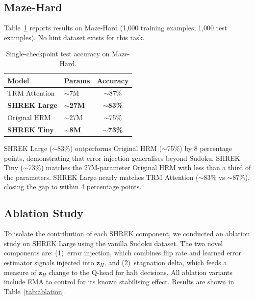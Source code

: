 \subsection{Maze-Hard}

Table~\ref{tab:maze} reports results on Maze-Hard (1{,}000 training examples, 1{,}000 test examples). No hint dataset exists for this task.

\begin{table}[htbp]
    \centering
    \caption{Single-checkpoint test accuracy on Maze-Hard.}
    \label{tab:maze}
    \begin{tabular}{llc}
        \toprule
        \textbf{Model}       & \textbf{Params}    & \textbf{Accuracy}   \\
        \midrule
        TRM Attention        & $\sim$7M           & $\sim$87\%          \\
        \textbf{SHREK Large} & \textbf{$\sim$27M} & \textbf{$\sim$83\%} \\
        Original HRM         & $\sim$27M          & $\sim$75\%          \\
        \textbf{SHREK Tiny}  & \textbf{$\sim$8M}  & \textbf{$\sim$73\%} \\
        \bottomrule
    \end{tabular}
\end{table}

SHREK Large ($\sim$83\%) outperforms Original HRM ($\sim$75\%) by 8 percentage points, demonstrating that error injection generalises beyond Sudoku. SHREK Tiny ($\sim$73\%) matches the 27M-parameter Original HRM with less than a third of the parameters. SHREK Large nearly matches TRM Attention ($\sim$83\% vs $\sim$87\%), closing the gap to within 4 percentage points.

\subsection{Ablation Study}

To isolate the contribution of each SHREK component, we conducted an ablation study on SHREK Large using the vanilla Sudoku dataset. The two novel components are: (1)~error injection, which combines flip rate and learned error estimator signals injected into $\mathbf{z}_H$, and (2)~stagnation delta, which feeds a measure of $\mathbf{z}_H$ change to the Q-head for halt decisions. All ablation variants include EMA to control for its known stabilising effect. Results are shown in Table~\ref{tab:ablation}.

